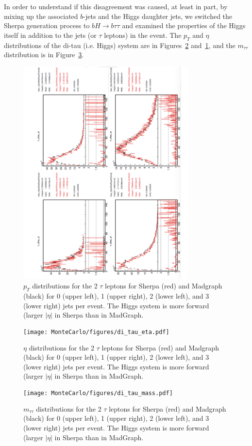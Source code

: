 In order to understand if this disagreement was caused, at least in part, by
mixing up the associated $b$-jets and the Higgs daughter jets, we switched the Sherpa
generation process to $bH\rightarrow b\tau\tau$ and examined the properties of the
Higgs itself in addition to the jets (or $\tau$ leptons) in the event.  The $p_T$ and 
$\eta$ distributions of the di-tau (i.e. Higgs) system are in Figures~\ref{fig:di_tau_eta}
and~\ref{fig:di_tau_pt}, and the $m_{\tau\tau}$ distribution is in Figure~\ref{fig:di_tau_mass}.



\begin{figure}
  \center
  \includegraphics[width=0.8\textwidth, angle=270]{MonteCarlo/figures/di_tau_pt.pdf}
  \caption{$p_T$ distributions for the 2 $\tau$ leptons for Sherpa (red) and Madgraph (black) for 0 (upper
  left), 1 (upper right), 2 (lower left), and 3 (lower right) jets per event. 
  The Higgs system is more forward (larger $|\eta|$ in Sherpa than in MadGraph.  \label{fig:di_tau_pt}}
\end{figure}
\begin{figure}
  \center
  \texttt{[image: MonteCarlo/figures/di\_tau\_eta.pdf]}
  \caption{$\eta$ distributions for the 2 $\tau$ leptons for Sherpa (red) and Madgraph (black) for 0 (upper
  left), 1 (upper right), 2 (lower left), and 3 (lower right) jets per event. 
  The Higgs system is more forward (larger $|\eta|$ in Sherpa than in MadGraph.  \label{fig:di_tau_eta}}
\end{figure}
\begin{figure}
  \center
  \texttt{[image: MonteCarlo/figures/di\_tau\_mass.pdf]}
  \caption{$m_{\tau\tau}$ distributions for the 2 $\tau$ leptons for Sherpa (red) and Madgraph (black) for 0 (upper
  left), 1 (upper right), 2 (lower left), and 3 (lower right) jets per event. 
  The Higgs system is more forward (larger $|\eta|$ in Sherpa than in MadGraph.  \label{fig:di_tau_mass}}
\end{figure}


